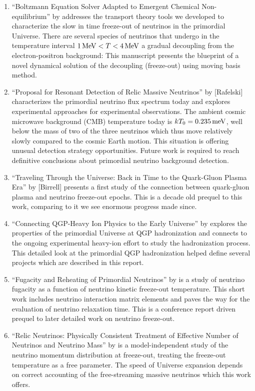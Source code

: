 \begin{enumerate}
%
\item ``Boltzmann Equation Solver Adapted to Emergent Chemical Non-equilibrium'' by  addresses the transport theory tools we developed to characterize the slow in time freeze-out of neutrinos in the primordial Universe. {\color{black} There are several species of neutrinos that undergo in the temperature interval $1\text{\,MeV}<T<4\text{\,MeV}$ a gradual decoupling from the electron-positron background: This manuscript presents the blueprint of a novel dynamical solution of the decoupling (freeze-out) using moving basis method.}
%
\item ``Proposal for Resonant Detection of Relic Massive Neutrinos'' by [Rafelski] characterizes the primordial neutrino flux spectrum today and explores experimental approaches for experimental observations. {\color{black} The ambient cosmic microwave background (CMB) temperature today is $kT_0=0.235\text{\,meV}$, well below the mass of two of the three neutrinos which thus move relatively slowly compared to the cosmic Earth motion. This situation is offering unusual detection strategy opportunities. Future work is required to reach definitive conclusions about primordial neutrino background detection.}
%
\item ``Traveling Through the Universe: Back in Time to the Quark-Gluon Plasma Era'' by [Birrell] presents a first study of the connection between quark-gluon plasma and neutrino freeze-out epochs. {\color{black} This is a decade old prequel to this work, comparing to it we see enormous progress made since.}
%
\item ``Connecting QGP-Heavy Ion Physics to the Early Universe'' by  explores the properties of the primordial Universe at QGP hadronization and connects to the ongoing experimental heavy-ion effort to study the hadronization process. {\color{black} This detailed look at the primordial QGP hadronization helped define several projects which are described in this report.}
%
\item ``Fugacity and Reheating of Primordial Neutrinos'' by  is a study of neutrino fugacity as a function of neutrino kinetic freeze-out temperature. This short work includes {\color{black} neutrino interaction matrix elements and paves the way for the evaluation of neutrino relaxation time. This is a conference report driven prequel to later detailed work on neutrino freeze-out.}
%
\item ``Relic Neutrinos: Physically Consistent Treatment of Effective Number of Neutrinos and Neutrino Mass'' by  is a model-independent study of the neutrino momentum distribution at freeze-out, treating the freeze-out temperature as a free parameter. {\color{black} The speed of Universe expansion depends on correct accounting of the free-streaming massive neutrinos which this work offers.}

\end{enumerate}
